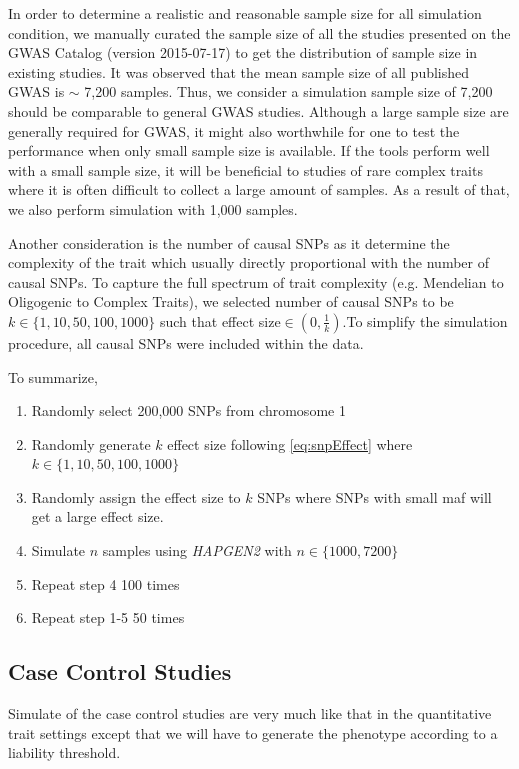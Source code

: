 \documentclass{book}
\begin{document}
			In order to determine a realistic and reasonable sample size for all simulation condition, we manually curated the sample size of all the studies presented on the \gls{GWAS} Catalog\cite{Welter2014} (version 2015-07-17) to get the distribution of sample size in existing studies.
			It was observed that the mean sample size of all published \gls{GWAS} is $\sim$ 7,200 samples. 
			Thus, we consider a simulation sample size of 7,200 should be comparable to general \gls{GWAS} studies.
			Although a large sample size are generally required for \gls{GWAS}, it might also worthwhile for one to test the performance when only small sample size is available.
			If the tools perform well with a small sample size, it will be beneficial to studies of rare complex traits where it is often difficult to collect a large amount of samples.
			As a result of that, we also perform simulation with 1,000 samples.
			
			Another consideration is the number of causal \glspl{SNP} as it determine the complexity of the trait which usually directly proportional with the number of causal \glspl{SNP}. 
			To capture the full spectrum of trait complexity (e.g. Mendelian to Oligogenic to Complex Traits), we selected number of causal \glspl{SNP} to be $k\in\{1,10,50,100,1000\}$ such that effect size$ \in(0,\frac{1}{k})$.To simplify the simulation procedure, all causal \glspl{SNP} were included within the data.
			
			To summarize, 
			\begin{enumerate}
				\item Randomly select 200,000 \glspl{SNP} from chromosome 1
				\item Randomly generate $k$ effect size following \cref{eq:snpEffect} where $k \in \{1,10,50,100,1000\}$
				\item Randomly assign the effect size to $k$ \glspl{SNP} where \glspl{SNP} with small \gls{maf} will get a large effect size.
				\item Simulate $n$ samples using \textit{HAPGEN2} with $n \in \{1000,7200\}$
				\item Repeat step 4 100 times
				\item Repeat step 1-5 50 times
			\end{enumerate}
		\subsection{Case Control Studies}
		Simulate of the case control studies are very much like that in the quantitative trait settings except that we will have to generate the phenotype according to a liability threshold.
		
\end{document}
